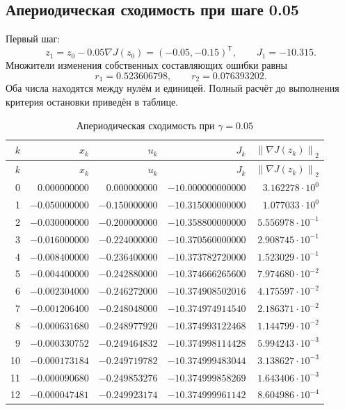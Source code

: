 \documentclass[12pt,a4paper]{article}
\newcommand{\norm}[1]{\left\lVert#1\right\rVert_2}
\begin{document}
\subsection{Апериодическая сходимость при шаге 0.05}
Первый шаг:
\[
z_1=z_0-0.05\nabla J(z_0)
=(-0.05,-0.15)^{\mathsf T},\qquad J_1=-10.315.
\]
Множители изменения собственных составляющих ошибки равны
\[
r_1=0.523606798,\qquad r_2=0.076393202.
\]
Оба числа находятся между нулём и единицей.
Полный расчёт до выполнения критерия остановки приведён в таблице.

\begin{center}\small\setlength{\tabcolsep}{4pt}
\begin{longtable}{r|r|r|r|r}
\caption{Апериодическая сходимость при $\gamma=0.05$}\\
\hline $k$&$x_k$&$u_k$&$J_k$&$\norm{\nabla J(z_k)}$\\\hline
\endfirsthead
\hline $k$&$x_k$&$u_k$&$J_k$&$\norm{\nabla J(z_k)}$\\\hline
\endhead
0 & $0.000000000$ & $0.000000000$ & $-10.000000000000$ & $3.162278\cdot10^{0}$ \\
1 & $-0.050000000$ & $-0.150000000$ & $-10.315000000000$ & $1.077033\cdot10^{0}$ \\
2 & $-0.030000000$ & $-0.200000000$ & $-10.358800000000$ & $5.556978\cdot10^{-1}$ \\
3 & $-0.016000000$ & $-0.224000000$ & $-10.370560000000$ & $2.908745\cdot10^{-1}$ \\
4 & $-0.008400000$ & $-0.236400000$ & $-10.373782720000$ & $1.523029\cdot10^{-1}$ \\
5 & $-0.004400000$ & $-0.242880000$ & $-10.374666265600$ & $7.974680\cdot10^{-2}$ \\
6 & $-0.002304000$ & $-0.246272000$ & $-10.374908502016$ & $4.175597\cdot10^{-2}$ \\
7 & $-0.001206400$ & $-0.248048000$ & $-10.374974914540$ & $2.186371\cdot10^{-2}$ \\
8 & $-0.000631680$ & $-0.248977920$ & $-10.374993122468$ & $1.144799\cdot10^{-2}$ \\
9 & $-0.000330752$ & $-0.249464832$ & $-10.374998114428$ & $5.994243\cdot10^{-3}$ \\
10 & $-0.000173184$ & $-0.249719782$ & $-10.374999483044$ & $3.138627\cdot10^{-3}$ \\
11 & $-0.000090680$ & $-0.249853276$ & $-10.374999858269$ & $1.643406\cdot10^{-3}$ \\
12 & $-0.000047481$ & $-0.249923174$ & $-10.374999961142$ & $8.604986\cdot10^{-4}$ \\

\end{longtable}
\end{center}
\end{document}
